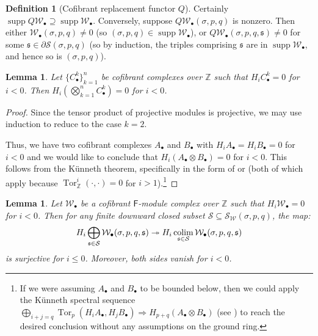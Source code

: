 \documentclass[12pt]{article}
\newtheorem{lemma}[theorem]{Lemma}
\theoremstyle{definition}
\newtheorem{definition}[theorem]{Definition}
\theoremstyle{remark}
\numberwithin{equation}{subsection}
\newcommand{\W}{\mathcal W}
\newcommand{\s}{\mathfrak s}
\newcommand{\ZZ}{\mathbb Z}
\newcommand{\SSS}{\mathcal S}
\newcommand{\Tor}{\operatorname{Tor}}
\newcommand{\colim}{\operatornamewithlimits{colim}}
\newcommand{\sF}{\mathsf{F}}
\newcommand{\supp}{\operatorname{supp}}
\begin{document}
\begin{definition}[Cofibrant replacement functor $Q$]
Certainly $\supp Q\W_\bullet\supseteq\supp\W_\bullet$.  Conversely, suppose $Q\W_\bullet(\sigma,p,q)$ is nonzero.  Then either $\W_\bullet(\sigma,p,q)\ne 0$ (so $(\sigma,p,q)\in\supp\W_\bullet$), or $Q\W_\bullet(\sigma,p,q,\s)\ne 0$ for some $\s\in\partial\SSS(\sigma,p,q)$ (so by induction, the triples comprising $\s$ are in $\supp\W_\bullet$, and hence so is $(\sigma,p,q)$).
\end{definition}

\begin{lemma}\label{tensorproductvanishing}
Let $\{C_\bullet^k\}_{k=1}^n$ be cofibrant complexes over $\ZZ$ such that $H_iC_\bullet^k=0$ for $i<0$.  Then $H_i(\bigotimes_{k=1}^nC_\bullet^k)=0$ for $i<0$.
\end{lemma}

\begin{proof}
Since the tensor product of projective modules is projective, we may use induction to reduce to the case $k=2$.

Thus, we have two cofibrant complexes $A_\bullet$ and $B_\bullet$ with $H_iA_\bullet=H_iB_\bullet=0$ for $i<0$ and we would like to conclude that $H_i(A_\bullet\otimes B_\bullet)=0$ for $i<0$.  This follows from the K\"unneth theorem, specifically in the form of \cite[p301, Theorem 9.16]{osborne} or \cite[p679, Theorem 10.81]{rotman} (both of which apply because $\Tor^i_\ZZ(\cdot,\cdot)=0$ for $i>1$).\footnote{If we were assuming $A_\bullet$ and $B_\bullet$ to be bounded below, then we could apply the K\"unneth spectral sequence $\bigoplus_{i+j=q}\Tor_p(H_iA_\bullet,H_jB_\bullet)\Rightarrow H_{p+q}(A_\bullet\otimes B_\bullet)$ (see \cite[p686, Theorem 10.90]{rotman}) to reach the desired conclusion without any assumptions on the ground ring.}
\end{proof}

\begin{lemma}\label{Hzeroofcofibrantcolimit}
Let $\W_\bullet$ be a cofibrant $\sF$-module complex over $\ZZ$ such that $H_i\W_\bullet=0$ for $i<0$.  Then for any finite downward closed subset $\SSS\subseteq\SSS_\W(\sigma,p,q)$, the map:
\begin{equation}\label{tocolimitsurjective}
H_i\bigoplus_{\mathfrak s\in\SSS}\W_\bullet(\sigma,p,q,\mathfrak s)\twoheadrightarrow H_i\colim_{\mathfrak s\in\SSS}\W_\bullet(\sigma,p,q,\mathfrak s)
\end{equation}
is surjective for $i\leq 0$.  Moreover, both sides vanish for $i<0$.
\end{lemma}
\end{document}
